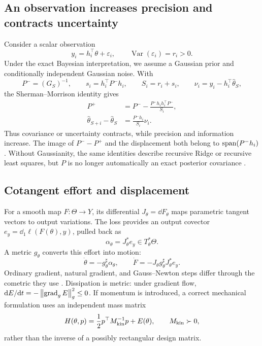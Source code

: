 \subsection{An observation increases precision and contracts uncertainty}
Consider a scalar observation
\[
y_i=h_i^\top\theta+\varepsilon_i,\qquad \operatorname{Var}(\varepsilon_i)=r_i>0.
\]
Under the exact Bayesian interpretation, we assume a Gaussian prior and conditionally independent Gaussian noise. With
\[
P^-=(G_S)^{-1},\qquad s_i=h_i^\top P^-h_i,
\qquad S_i=r_i+s_i,
\qquad \nu_i=y_i-h_i^\top\widehat\theta_S,
\]
the Sherman--Morrison identity \citep{sherman1950} gives
\begin{align}
P^+&=P^--\frac{P^-h_ih_i^\top P^-}{S_i},\label{eq:cov-update}\\
\widehat\theta_{S+i}-\widehat\theta_S
&=\frac{P^-h_i}{S_i}\nu_i.\label{eq:mean-update}
\end{align}
Thus covariance or uncertainty contracts, while precision and information increase. The image of $P^--P^+$ and the displacement both belong to $\operatorname{span}(P^-h_i)$. Without Gaussianity, the same identities describe recursive Ridge or recursive least squares, but $P$ is no longer automatically an exact posterior covariance \citep{kalman1960,ollivier2017}.

\subsection{Cotangent effort and displacement}
For a smooth map $F:\Theta\to Y$, its differential $J_\theta=\dd F_\theta$ maps parametric tangent vectors to output variations. The loss provides an output covector $e_y=\dd_1\ell(F(\theta),y)$, pulled back as
\[
\alpha_\theta=J_\theta^*e_y\in T_\theta^*\Theta.
\]
A metric $g_\theta$ converts this effort into motion:
\begin{equation}
\dot\theta=-g_\theta^\sharp\alpha_\theta,
\qquad
\dot F=-J_\theta g_\theta^\sharp J_\theta^*e_y.
\end{equation}
Ordinary gradient, natural gradient, and Gauss--Newton steps differ through the cometric they use \citep{amari1998,ollivier2015,martens2020}. Dissipation is metric: under gradient flow, $\mathrm d E/\mathrm d t=-\left\lVert \operatorname{grad}_gE\right\rVert_g^2\leq0$. If momentum is introduced, a correct mechanical formulation uses an independent mass matrix
\[
H(\theta,p)=\frac12p^\top M_{\rm kin}^{-1}p+E(\theta),\qquad M_{\rm kin}\succ0,
\]
rather than the inverse of a possibly rectangular design matrix.

